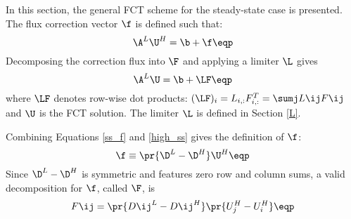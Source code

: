 In this section, the general FCT scheme for the steady-state case is presented.
The flux correction vector $\f$ is defined such that:
\begin{equation}\label{ss_f}
   \A^L\U^H = \b + \f \eqp
\end{equation}
Decomposing the correction flux into $\F$ and applying a limiter
$\L$ gives
\begin{equation}\label{FCT_limited_ss}
   \A^L\U = \b + \LF \eqp
\end{equation}
where $\LF$ denotes row-wise dot products: $(\LF)_i = L_{i,:}F_{i,:}^T
= \sumj L\ij F\ij$ and $\U$ is the FCT solution.  The limiter $\L$ is
defined in Section \ref{L}.

Combining Equations \eqref{ss_f} and \eqref{high_ss}
gives the definition of $\f$:
\begin{equation}
   \f \equiv \pr{\D^L-\D^H}\U^H \eqp
\end{equation}
Since $\D^L-\D^H$ is symmetric
and features zero row and column sums, a valid decomposition for $\f$,
called $\F$, is
\begin{equation}
   F\ij = \pr{D\ij^L-D\ij^H}\pr{U_j^H - U_i^H} \eqp
\end{equation}
